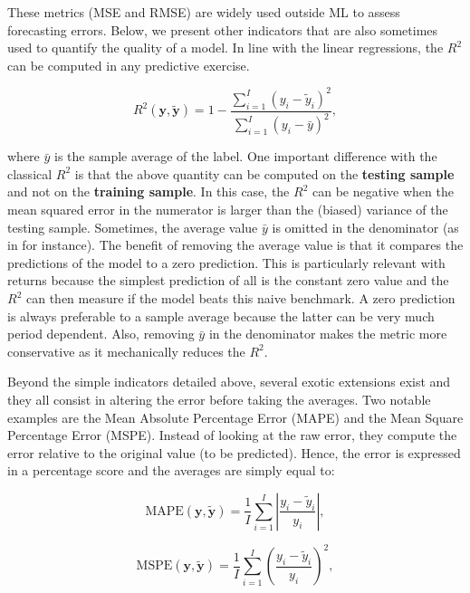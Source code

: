 These metrics (MSE and RMSE) are widely used outside ML to assess forecasting errors. Below, we present other indicators that are also sometimes used to quantify the quality of a model. In line with the linear regressions, the $R^2$ can be computed in any predictive exercise.

\begin{equation}
\label{eq-R2}
R^2(\textbf{y},\tilde{\textbf{y}})=1- \frac{\sum_{i=1}^I(y_i-\tilde{y}_i)^2}{\sum_{i=1}^I(y_i-\bar{y})^2},
\end{equation}

where $\bar{y}$ is the sample average of the label. One important difference with the classical $R^2$ is that the above quantity can be computed on the \textbf{testing sample} and not on the \textbf{training sample}. In this case, the $R^2$ can be negative when the mean squared error in the numerator is larger than the (biased) variance of the testing sample. Sometimes, the average value $\bar{y}$ is omitted in the denominator (as in \cite{gu2018empirical} for instance). The benefit of removing the average value is that it compares the predictions of the model to a zero prediction. This is particularly relevant with returns because the simplest prediction of all is the constant zero value and the $R^2$ can then measure if the model beats this naive benchmark. A zero prediction is always preferable to a sample average because the latter can be very much period dependent. Also, removing $\bar{y}$ in the denominator makes the metric more conservative as it mechanically reduces the $R^2$.

Beyond the simple indicators detailed above, several exotic extensions exist and they all consist in altering the error before taking the averages. Two notable examples are the Mean Absolute Percentage Error (MAPE) and the Mean Square Percentage Error (MSPE). Instead of looking at the raw error, they compute the error relative to the original value (to be predicted). Hence, the error is expressed in a percentage score and the averages are simply equal to:

\begin{equation}
\label{eq-MAPE}
\text{MAPE}(\textbf{y},\tilde{\textbf{y}})=\frac{1}{I}\sum_{i=1}^I\left|\frac{y_i-\tilde{y}_i}{y_i}\right|,
\end{equation}

\begin{equation}
\label{eq-MSPE}
\text{MSPE}(\textbf{y},\tilde{\textbf{y}})=\frac{1}{I}\sum_{i=1}^I\left(\frac{y_i-\tilde{y}_i}{y_i}\right)^2,
\end{equation}

